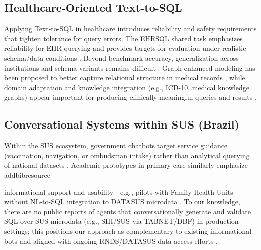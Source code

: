 \documentclass[sigconf,natbib=false]{acmart}
\begin{document}
\subsection{Healthcare-Oriented Text-to-SQL}
Applying Text-to-SQL in healthcare introduces reliability and safety requirements that tighten tolerance for query errors. The EHRSQL shared task emphasizes reliability for EHR querying and provides targets for evaluation under realistic schema/data conditions \cite{lee2024ehrsql}. Beyond benchmark accuracy, generalization across institutions and schema variants remains difficult \cite{wang2024towards}. Graph-enhanced modeling has been proposed to better capture relational structure in medical records \cite{zhang2024graph}, while domain adaptation and knowledge integration (e.g., ICD-10, medical knowledge graphs) appear important for producing clinically meaningful queries and results \cite{kim2024clinical,roberts2024medical}.

\subsection{Conversational Systems within SUS (Brazil)}
Within the SUS ecosystem, government chatbots target service guidance (vaccination, navigation, or ombudsman intake) rather than analytical querying of national datasets \cite{ms_vax_chatbot_2023,ouvsus_chatbot_2024,meususdigital_portal}. Academic prototypes in primary care similarly emphasize addbibresource

informational support and usability—e.g., pilots with Family Health Units—without NL-to-SQL integration to DATASUS microdata \cite{jhi_aps_chatbot_2024}. To our knowledge, there are no public reports of agents that conversationally generate and validate SQL over SUS microdata (e.g., SIH/SUS via TABNET/DBF) in production settings; this positions our approach as complementary to existing informational bots and aligned with ongoing RNDS/DATASUS data-access efforts \cite{rnds_site,tabnet_manual,datasus_transfer}.



\end{document}
